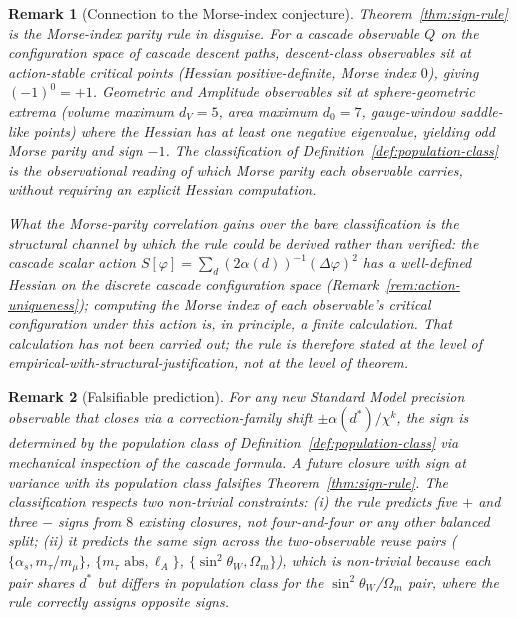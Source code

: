 \documentclass[12pt,a4paper]{article}
\newtheorem*{remark}{Remark}
\begin{document}
\begin{remark}[Connection to the Morse-index conjecture]\label{rem:sign-morse-parity}
Theorem~\ref{thm:sign-rule} is the Morse-index parity rule in
disguise. For a cascade observable $Q$ on the configuration space of
cascade descent paths, descent-class observables sit at action-stable
critical points (Hessian positive-definite, Morse index $0$), giving
$(-1)^0 = +1$. Geometric and Amplitude observables sit at
sphere-geometric extrema (volume maximum $d_V=5$, area maximum $d_0=7$,
gauge-window saddle-like points) where the Hessian has at least one
negative eigenvalue, yielding odd Morse parity and sign $-1$. The
classification of Definition~\ref{def:population-class} is the
observational reading of which Morse parity each observable carries,
without requiring an explicit Hessian computation.

What the Morse-parity correlation gains over the bare classification is
the structural channel by which the rule could be \emph{derived} rather
than verified: the cascade scalar action $S[\varphi] = \sum_d
(2\alpha(d))^{-1}(\Delta\varphi)^2$ has a well-defined Hessian on the
discrete cascade configuration space (Remark~\ref{rem:action-uniqueness});
computing the Morse index of each observable's critical configuration
under this action is, in principle, a finite calculation. That
calculation has not been carried out; the rule is therefore stated at
the level of empirical-with-structural-justification, not at the level
of theorem.
\end{remark}

\begin{remark}[Falsifiable prediction]\label{rem:sign-falsifier}
For any new Standard Model precision observable that closes via a
correction-family shift $\pm\alpha(d^*)/\chi^k$, the sign is determined
by the population class of Definition~\ref{def:population-class} via
mechanical inspection of the cascade formula. A future closure with
sign at variance with its population class falsifies
Theorem~\ref{thm:sign-rule}. The classification respects two
non-trivial constraints:
(i) the rule predicts \emph{five $+$ and three $-$ signs} from
$8$ existing closures, not four-and-four or any other balanced split;
(ii) it predicts the same sign across the two-observable reuse pairs
($\{\alpha_s, m_\tau/m_\mu\}$, $\{m_\tau\text{ abs}, \ell_A\}$, $\{\sin^2\theta_W,\Omega_m\}$),
which is non-trivial because each pair shares $d^*$ but differs in
population class for the $\sin^2\theta_W$/$\Omega_m$ pair, where the
rule correctly assigns opposite signs.
\end{remark}
\end{document}
